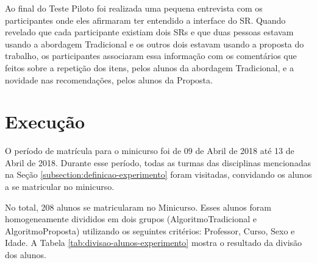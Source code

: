 Ao final do Teste Piloto foi realizada uma pequena entrevista com os participantes onde eles afirmaram ter entendido
a interface do SR. Quando revelado que cada participante existiam dois SRs e que duas pessoas estavam usando a abordagem
Tradicional e os outros dois estavam usando a proposta do trabalho, os participantes associaram essa informação com os
comentários que feitos sobre a repetição dos itens, pelos alunos da abordagem Tradicional, e a novidade nas recomendações,
pelos alunos da Proposta.

\section{Execução}\label{section:execucao-experimento}

O período de matrícula para o minicurso foi de 09 de Abril de 2018 até 13 de Abril de 2018. Durante esse período, todas as turmas
das disciplinas mencionadas na Seção \ref{subsection:definicao-experimento} foram visitadas, convidando os alunos a se matricular no minicurso.

No total, 208 alunos se matricularam no Minicurso. Esses alunos foram homogeneamente divididos em dois grupos (AlgoritmoTradicional
e AlgoritmoProposta) utilizando os seguintes critérios: Professor, Curso, Sexo e Idade. A Tabela \ref{tab:divisao-alunos-experimento} mostra o resultado da divisão dos alunos.

